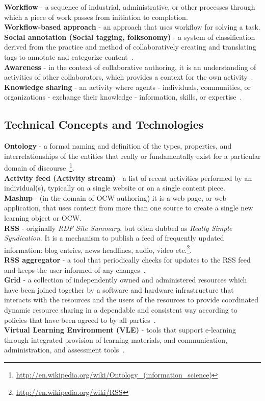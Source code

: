 \documentclass[ngerman,UKenglish,table]{scrbook}
\begin{document}
\textbf{Workflow} - a sequence of industrial, administrative, or other processes through which a piece of work passes from initiation to completion.\\
\textbf{Workflow-based approach} - an approach that uses workflow for solving a task.\\
\textbf{Social annotation (Social tagging, folksonomy)} - a system of classification derived from the practice and method of collaboratively creating and translating tags to annotate and categorize content~\cite{peters2009folksonomies}.\\
\textbf{Awareness} - in the context of collaborative authoring, it is an understanding of activities of other collaborators, which provides a context for the own activity~\cite{Halimi2011}.\\
\textbf{Knowledge sharing} - an activity where agents - individuals, communities, or organizations - exchange their knowledge - information, skills, or expertise~\cite{ireson2010knowledge}.\\

\subsection{Technical Concepts and Technologies}
\textbf{Ontology} - a formal naming and definition of the types, properties, and interrelationships of the entities that really or fundamentally exist for a particular domain of discourse~\footnote{\url{http://en.wikipedia.org/wiki/Ontology_(information_science)}}.\\
\textbf{Activity feed (Activity stream)} - a list of recent activities performed by an individual(s), typically on a single website or on a single content piece.\\
\textbf{Mashup} - (in the domain of OCW authoring) it is a web page, or web application, that uses content from more than one source to create a single new learning object or OCW.\\
\textbf{RSS} - originally \emph{RDF Site Summary}, but often dubbed as \emph{Really Simple Syndication}.
It is a mechanism to publish a feed of frequently updated information: blog entries, news headlines, audio, video etc.\footnote{\url{http://en.wikipedia.org/wiki/RSS}}.\\
\textbf{RSS aggregator} - a tool that periodically checks for updates to the RSS feed and keeps the user informed of any changes~\cite{andersen2007web}.\\
\textbf{Grid} - a collection of independently owned and administered resources which have been joined together by a software and hardware infrastructure that interacts with the resources and the users of the resources to provide coordinated dynamic resource sharing in a dependable and consistent way according to policies that have been agreed to by all parties~\cite{hamid2010efficient}.\\
\textbf{Virtual Learning Environment (VLE)} - tools that support e-learning through integrated provision of learning materials, and communication, administration, and assessment tools~\cite{Currier2002}.\\
\end{document}
